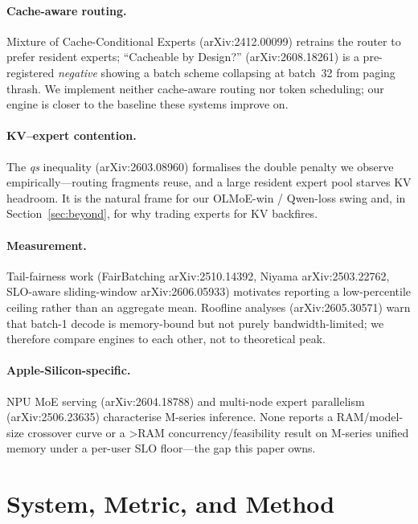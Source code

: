 \documentclass[11pt]{article}
\begin{document}
\paragraph{Cache-aware routing.} Mixture of Cache-Conditional Experts
(arXiv:2412.00099) retrains the router to prefer resident experts; ``Cacheable by
Design?'' (arXiv:2608.18261) is a pre-registered \emph{negative} showing a batch
scheme collapsing at batch~32 from paging thrash. We implement neither cache-aware
routing nor token scheduling; our engine is closer to the baseline these systems
improve on.

\paragraph{KV--expert contention.} The \emph{qs} inequality (arXiv:2603.08960)
formalises the double penalty we observe empirically---routing fragments reuse, and a
large resident expert pool starves KV headroom. It is the natural frame for our
OLMoE-win / Qwen-loss swing and, in Section~\ref{sec:beyond}, for why trading experts
for KV backfires.

\paragraph{Measurement.} Tail-fairness work (FairBatching arXiv:2510.14392, Niyama
arXiv:2503.22762, SLO-aware sliding-window arXiv:2606.05933) motivates reporting a
low-percentile ceiling rather than an aggregate mean. Roofline analyses
(arXiv:2605.30571) warn that batch-1 decode is memory-bound but not purely
bandwidth-limited; we therefore compare engines to each other, not to theoretical peak.

\paragraph{Apple-Silicon-specific.} NPU MoE serving (arXiv:2604.18788) and multi-node
expert parallelism (arXiv:2506.23635) characterise M-series inference. None reports a
RAM/model-size crossover curve or a >RAM concurrency/feasibility result on M-series
unified memory under a per-user SLO floor---the gap this paper owns.

\section{System, Metric, and Method}
\label{sec:method}
\end{document}
